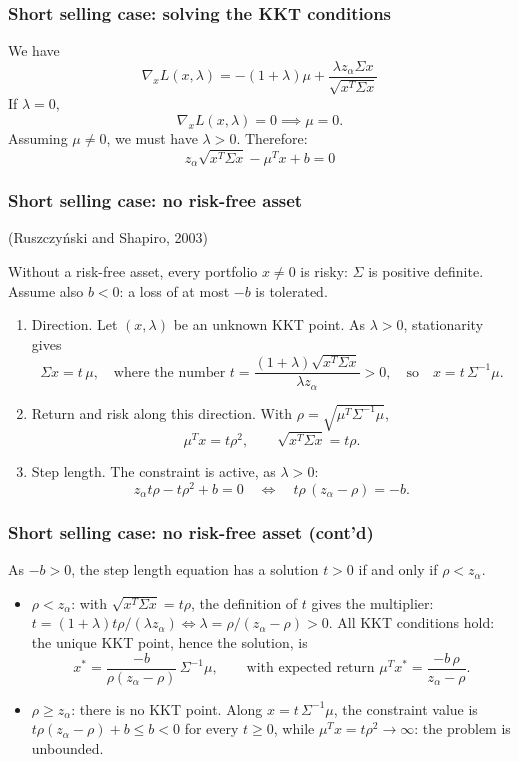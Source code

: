 \documentclass[aspectratio=169]{beamer}
\begin{document}
\begin{frame}
\frametitle{Short selling case: solving the KKT conditions}

We have
\[
\nabla_x L(x, \lambda) = -(1+\lambda)\mu+\frac{\lambda z_{\alpha}\Sigma x}{\sqrt{x^T\Sigma x}}
\]
If $\lambda = 0$,
\[
\nabla_x L(x, \lambda) = 0 \implies \mu = 0.
\]
Assuming $\mu \neq 0$, we must have $\lambda > 0$. Therefore:
\[
z_{\alpha} \sqrt{x^T\Sigma x} - \mu^Tx + b = 0
\]

\end{frame}

\begin{frame}
\frametitle{Short selling case: no risk-free asset}

(Ruszczyński and Shapiro, 2003)

\smallskip

Without a risk-free asset, every portfolio $x \neq 0$ is risky: $\Sigma$ is positive definite.
Assume also $b < 0$: a loss of at most $-b$ is tolerated.

\begin{enumerate}
\item
{\red Direction.} Let $(x,\lambda)$ be an unknown KKT point. As $\lambda > 0$, stationarity gives
\[
\Sigma x = t\, \mu, \quad \text{where the number } t = \frac{(1+\lambda)\sqrt{x^T\Sigma x}}{\lambda z_{\alpha}} > 0,
\quad \text{so} \quad x = t\, \Sigma^{-1}\mu.
\]
\item
{\red Return and risk along this direction.} With $\rho = \sqrt{\mu^T\Sigma^{-1}\mu}$,
\[
\mu^T x = t \rho^2, \qquad \sqrt{x^T\Sigma x} = t\rho.
\]
\item
{\red Step length.} The constraint is active, as $\lambda > 0$:
\[
z_{\alpha} t\rho - t\rho^2 + b = 0
\quad \Longleftrightarrow \quad
t\rho\,(z_{\alpha} - \rho) = -b.
\]
\end{enumerate}

\end{frame}

\begin{frame}
\frametitle{Short selling case: no risk-free asset (cont'd)}

As $-b > 0$, the step length equation has a solution $t > 0$ if and only if $\rho < z_{\alpha}$.
\begin{itemize}
\item
{\red $\rho < z_{\alpha}$}: with $\sqrt{x^T\Sigma x} = t\rho$, the definition of $t$ gives the multiplier: $t = (1+\lambda)t\rho/(\lambda z_{\alpha}) \iff \lambda = \rho/(z_{\alpha}-\rho) > 0$. All KKT conditions hold: the unique KKT point, hence the solution, is
\[
x^* = \frac{-b}{\rho(z_{\alpha}-\rho)}\, \Sigma^{-1}\mu,
\qquad \text{with expected return } \mu^Tx^* = \frac{-b\,\rho}{z_{\alpha}-\rho}.
\]
\item
{\red $\rho \geq z_{\alpha}$}: there is no KKT point. Along $x = t\, \Sigma^{-1}\mu$, the constraint value is $t\rho(z_{\alpha}-\rho) + b \leq b < 0$ for every $t \geq 0$, while $\mu^Tx = t\rho^2 \to \infty$: the problem is {\red unbounded}.
\end{itemize}

\end{frame}
\end{document}
